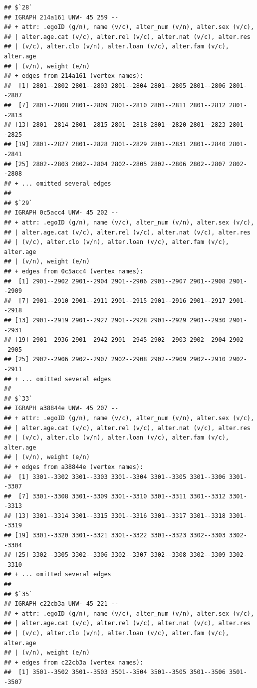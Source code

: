 \documentclass[
]{book}
\begin{document}
\begin{verbatim}
## $`28`
## IGRAPH 214a161 UNW- 45 259 -- 
## + attr: .egoID (g/n), name (v/c), alter_num (v/n), alter.sex (v/c),
## | alter.age.cat (v/c), alter.rel (v/c), alter.nat (v/c), alter.res
## | (v/c), alter.clo (v/n), alter.loan (v/c), alter.fam (v/c), alter.age
## | (v/n), weight (e/n)
## + edges from 214a161 (vertex names):
##  [1] 2801--2802 2801--2803 2801--2804 2801--2805 2801--2806 2801--2807
##  [7] 2801--2808 2801--2809 2801--2810 2801--2811 2801--2812 2801--2813
## [13] 2801--2814 2801--2815 2801--2818 2801--2820 2801--2823 2801--2825
## [19] 2801--2827 2801--2828 2801--2829 2801--2831 2801--2840 2801--2841
## [25] 2802--2803 2802--2804 2802--2805 2802--2806 2802--2807 2802--2808
## + ... omitted several edges
## 
## $`29`
## IGRAPH 0c5acc4 UNW- 45 202 -- 
## + attr: .egoID (g/n), name (v/c), alter_num (v/n), alter.sex (v/c),
## | alter.age.cat (v/c), alter.rel (v/c), alter.nat (v/c), alter.res
## | (v/c), alter.clo (v/n), alter.loan (v/c), alter.fam (v/c), alter.age
## | (v/n), weight (e/n)
## + edges from 0c5acc4 (vertex names):
##  [1] 2901--2902 2901--2904 2901--2906 2901--2907 2901--2908 2901--2909
##  [7] 2901--2910 2901--2911 2901--2915 2901--2916 2901--2917 2901--2918
## [13] 2901--2919 2901--2927 2901--2928 2901--2929 2901--2930 2901--2931
## [19] 2901--2936 2901--2942 2901--2945 2902--2903 2902--2904 2902--2905
## [25] 2902--2906 2902--2907 2902--2908 2902--2909 2902--2910 2902--2911
## + ... omitted several edges
## 
## $`33`
## IGRAPH a38844e UNW- 45 207 -- 
## + attr: .egoID (g/n), name (v/c), alter_num (v/n), alter.sex (v/c),
## | alter.age.cat (v/c), alter.rel (v/c), alter.nat (v/c), alter.res
## | (v/c), alter.clo (v/n), alter.loan (v/c), alter.fam (v/c), alter.age
## | (v/n), weight (e/n)
## + edges from a38844e (vertex names):
##  [1] 3301--3302 3301--3303 3301--3304 3301--3305 3301--3306 3301--3307
##  [7] 3301--3308 3301--3309 3301--3310 3301--3311 3301--3312 3301--3313
## [13] 3301--3314 3301--3315 3301--3316 3301--3317 3301--3318 3301--3319
## [19] 3301--3320 3301--3321 3301--3322 3301--3323 3302--3303 3302--3304
## [25] 3302--3305 3302--3306 3302--3307 3302--3308 3302--3309 3302--3310
## + ... omitted several edges
## 
## $`35`
## IGRAPH c22cb3a UNW- 45 221 -- 
## + attr: .egoID (g/n), name (v/c), alter_num (v/n), alter.sex (v/c),
## | alter.age.cat (v/c), alter.rel (v/c), alter.nat (v/c), alter.res
## | (v/c), alter.clo (v/n), alter.loan (v/c), alter.fam (v/c), alter.age
## | (v/n), weight (e/n)
## + edges from c22cb3a (vertex names):
##  [1] 3501--3502 3501--3503 3501--3504 3501--3505 3501--3506 3501--3507

\end{verbatim}
\end{document}
